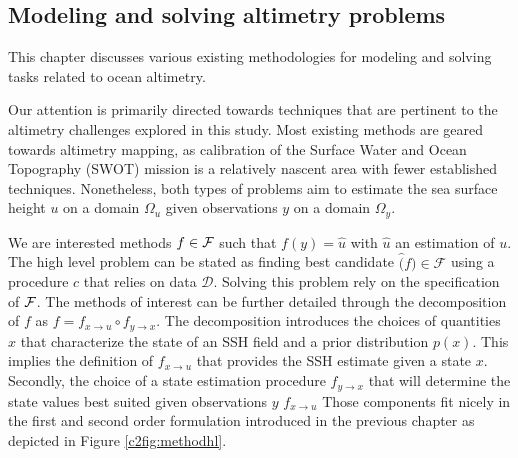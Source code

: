\begin{bibunit}

  \chapter{Modeling and solving altimetry problems}
  

This chapter discusses various existing methodologies for modeling and solving tasks related to ocean altimetry. 



Our attention is primarily directed towards techniques that are pertinent to the altimetry challenges explored in this study. Most existing methods are geared towards altimetry mapping, as calibration of the Surface Water and Ocean Topography (SWOT) mission is a relatively nascent area with fewer established techniques. Nonetheless, both types of problems aim to estimate the sea surface height $u$ on a domain $\Omega_u$ given observations $y$ on a domain $\Omega_y$.

  We are interested methods $f \in \cal{F}$ such that $f(y) = \hat{u}$ with $\hat{u}$ an estimation of $u$.
   The high level problem can be stated as finding best candidate $\hat(f) \in \mathcal{F}$ using a procedure $c$ that relies on data $\mathcal{D}$. 
   Solving this problem rely on the specification of $\cal{F}$.
  The methods of interest can be further detailed through the decomposition of $f$  as $f = f_{x\to u} \circ f_{y\to x}$. The decomposition introduces the choices of quantities $x$ that characterize the state of an SSH field and a prior distribution $p(x)$. This implies the definition of $f_{x\to u}$ that provides the SSH estimate given a state $x$.
  Secondly, the choice of a state estimation procedure $f_{y\to x}$ that will determine the state values best suited given observations $y$
$f_{x\to u}$
  Those components fit nicely in the first and second order formulation introduced in the previous chapter as depicted in Figure \ref{c2fig:methodhl}.


\end{bibunit}
